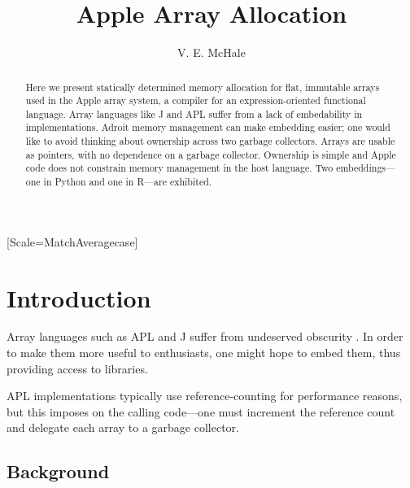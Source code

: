 \documentclass[sigplan,screen,anonymous]{acmart}
\begin{document}
\setmonofont{Jet Brains Mono}[Scale=MatchAveragecase]


\begin{abstract}
    Here we present statically determined memory allocation for flat, immutable arrays used in the Apple array system, a compiler for an expression-oriented functional language.
    Array languages like J and APL suffer from a lack of embedability in implementations. Adroit memory management can make embedding easier; one would like to avoid thinking about ownership across two garbage collectors.
    Arrays are usable as pointers, with no dependence on a garbage collector.
    Ownership is simple and Apple code does not constrain memory management in the host language.
    Two embeddings---one in Python and one in R---are exhibited.
\end{abstract}

\title{Apple Array Allocation}
\author{V. E. McHale}
\maketitle

\section{Introduction}

Array languages such as APL and J suffer from undeserved obscurity \cite{hsu2023}. In order to make them more useful to enthusiasts, one might hope to embed them, thus providing access to libraries. %


APL implementations typically use reference-counting \cite[p.~47]{hui2020} for performance reasons, but this imposes on the calling code---one must increment the reference count and delegate each array to a garbage collector.

\subsection{Background}
\end{document}
